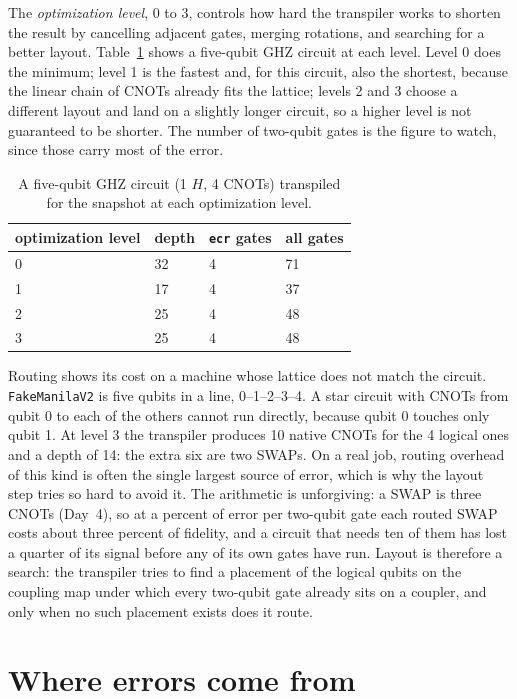 \documentclass[11pt]{article}
\newcommand{\code}[1]{\texttt{#1}}
\begin{document}
The \emph{optimization level}, 0 to 3, controls how hard the transpiler works to shorten the result by cancelling adjacent gates, merging rotations, and searching for a better layout. Table~\ref{tab:levels} shows a five-qubit GHZ circuit at each level. Level 0 does the minimum; level 1 is the fastest and, for this circuit, also the shortest, because the linear chain of CNOTs already fits the lattice; levels 2 and 3 choose a different layout and land on a slightly longer circuit, so a higher level is not guaranteed to be shorter. The number of two-qubit gates is the figure to watch, since those carry most of the error.

\begin{table}[h]
\centering
\small
\begin{tabular}{@{}llll@{}}
\toprule
optimization level & depth & \code{ecr} gates & all gates \\
\midrule
0 & 32 & 4 & 71 \\
1 & 17 & 4 & 37 \\
2 & 25 & 4 & 48 \\
3 & 25 & 4 & 48 \\
\bottomrule
\end{tabular}
\caption{A five-qubit GHZ circuit (1 $H$, 4 CNOTs) transpiled for the snapshot at each optimization level.}
\label{tab:levels}
\end{table}

Routing shows its cost on a machine whose lattice does not match the circuit. \code{FakeManilaV2} is five qubits in a line, 0--1--2--3--4. A star circuit with CNOTs from qubit 0 to each of the others cannot run directly, because qubit 0 touches only qubit 1. At level 3 the transpiler produces 10 native CNOTs for the 4 logical ones and a depth of 14: the extra six are two SWAPs. On a real job, routing overhead of this kind is often the single largest source of error, which is why the layout step tries so hard to avoid it. The arithmetic is unforgiving: a SWAP is three CNOTs (Day~4), so at a percent of error per two-qubit gate each routed SWAP costs about three percent of fidelity, and a circuit that needs ten of them has lost a quarter of its signal before any of its own gates have run. Layout is therefore a search: the transpiler tries to find a placement of the logical qubits on the coupling map under which every two-qubit gate already sits on a coupler, and only when no such placement exists does it route.

\section{Where errors come from}
\end{document}
